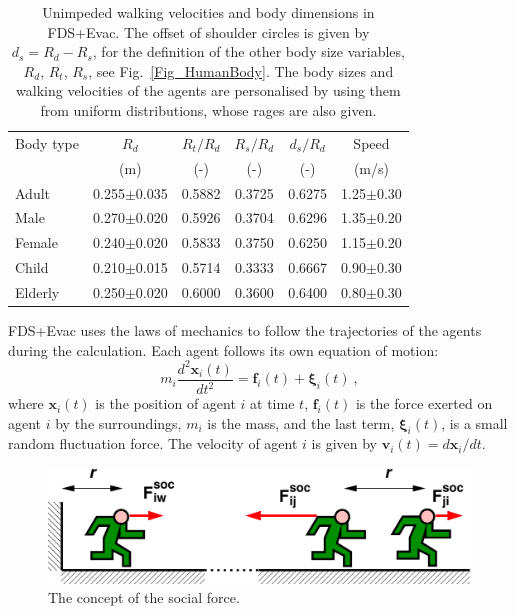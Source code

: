 \documentclass[12pt,a4paper,final,twoside]{stylevk}
\begin{document}
%
\begin{table}[b!]
\begin{center}
\caption{Unimpeded walking velocities and body dimensions in FDS+Evac.
   The offset of shoulder circles is given by $d_s = R_d - R_s$, for the
   definition of the other body size variables, $R_d$, $R_t$, $R_s$,
   see Fig.~\protect\ref{Fig_HumanBody}.  The body sizes and walking
   velocities of the agents are personalised by using them from uniform
   distributions, whose rages are also given.}\label{Table_DefaultHumans}  
\vspace{12pt}
\begin{tabular}{l c c c c c}\hline\hline 
Body type & $R_d$& $R_t/R_d$ & $R_s/R_d$  & $d_s/R_d$ & Speed \\
          & (m)  & (-)   &  (-)    & (-)    & (m/s) \\ \hline
Adult     & 0.255$\pm$0.035 & 0.5882 & 0.3725 & 0.6275 & 
          1.25$\pm$0.30 \\  %
Male      & 0.270$\pm$0.020 & 0.5926 & 0.3704 & 0.6296 &
          1.35$\pm$0.20 \\  %
Female    & 0.240$\pm$0.020 & 0.5833 & 0.3750 & 0.6250 & 
          1.15$\pm$0.20 \\  %
Child     & 0.210$\pm$0.015 & 0.5714 & 0.3333 & 0.6667 & 
          0.90$\pm$0.30 \\  %
Elderly   & 0.250$\pm$0.020 & 0.6000 & 0.3600 & 0.6400 & 
          0.80$\pm$0.30 \\ \hline\hline  %
\end{tabular}
\end{center}
\end{table}
%

FDS+Evac uses the laws of mechanics to follow the trajectories of the
agents during the calculation.  Each agent follows its own equation of
motion:
%
\begin{equation}\label{Eq_motion}
   m_i \frac{d^2 \mathbf{x}_i (t)}{dt^2} = \mathbf{f}_i (t)  +
  {\boldsymbol  \xi}_i (t) ~,  
\end{equation}
%
where $\mathbf{x}_i (t)$ is the position of agent $i$ at time $t$,
$\mathbf{f}_i (t)$ is the force exerted on agent $i$ by the
surroundings, $m_i$ is the mass, and the last term, ${\boldsymbol
  \xi}_i (t)$, is a small random fluctuation force.  The velocity of
agent $i$ is given by $\mathbf{v}_i (t) = d\mathbf{x}_i/dt$.

%
\begin{figure}[tb]
  \centerline{\includegraphics[clip=true,
  width=120mm]{FIGURES/voimakuvat_Poster}}  
  \caption{The concept of the social force.}\label{Fig_SocForce}
\end{figure}
%
\end{document}
